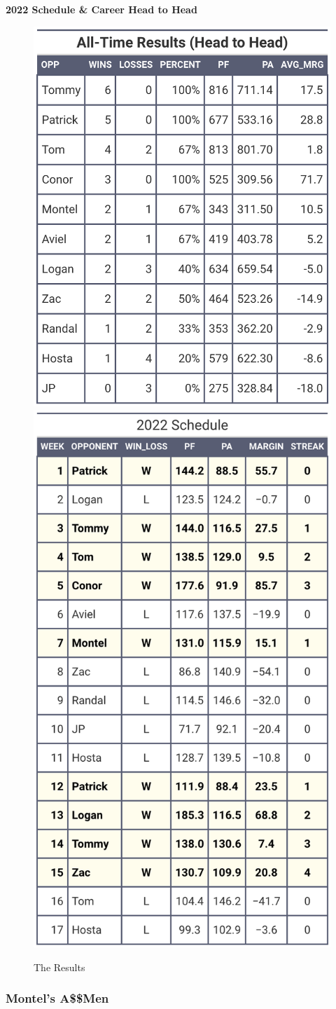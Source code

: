 \documentclass[
]{article}
\begin{document}
\textbf{2022 Schedule \& Career Head to Head}

\begin{figure}
\includegraphics[width=0.5\linewidth,height=0.5\textheight]{output/headtohead/Naad_head_to_head} \includegraphics[width=0.5\linewidth,height=0.5\textheight]{output/py_schedule/season_results_Naad} \caption{The Results}\label{fig:unnamed-chunk-10}
\end{figure}

\hypertarget{montels-amen}{%
\subsubsection{Montel's A\$\$Men}\label{montels-amen}}
\end{document}
